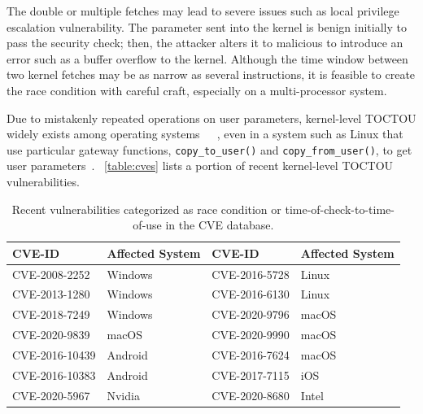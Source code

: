 The double or multiple fetches may lead to severe issues such as local privilege escalation vulnerability. The parameter sent into the kernel is benign initially to pass the security check; then, the attacker alters it to malicious to introduce an error such as a buffer overflow to the kernel. Although the time window between two kernel fetches may be as narrow as several instructions, it is feasible to create the race condition with careful craft, especially on a multi-processor system.


Due to mistakenly repeated operations on user parameters, kernel-level TOCTOU widely exists among operating systems~\cite{watson2007exploiting}~\cite{yang2012concurrency}~\cite{lu2008learning}, even in a system such as Linux that use particular gateway functions, \texttt{copy\_to\_user()} and \texttt{copy\_from\_user()}, to get user parameters~\cite{double-fetch-linux}. ~\autoref{table:cves} lists a portion of recent kernel-level TOCTOU vulnerabilities.


\begin{center}
\begin{table}[ht]
\small
\caption{Recent vulnerabilities categorized as race condition or time-of-check-to-time-of-use in the CVE database.}
\label{table:cves}
\centering
	\begin{tabular}{@{}>{\raggedright\arraybackslash}m{2.35cm}@{}|
			@{}>{\centering\arraybackslash}m{1.35cm}@{}|
			@{}>{\centering\arraybackslash}m{2.35cm}@{}|
			@{}>{\centering\arraybackslash}m{1.25cm}@{} } 
\hline
CVE-ID & Affected System & CVE-ID & Affected System \\ %
\hline
CVE-2008-2252  & Windows & CVE-2016-5728 & Linux \\
CVE-2013-1280  & Windows & CVE-2016-6130 & Linux \\
CVE-2018-7249  & Windows & CVE-2020-9796 & macOS \\ 
CVE-2020-9839  & macOS   & CVE-2020-9990 & macOS \\
CVE-2016-10439 & Android & CVE-2016-7624 & macOS \\
CVE-2016-10383 & Android & CVE-2017-7115 & iOS \\

CVE-2020-5967  & Nvidia  & CVE-2020-8680 & Intel \\
\hline

\end{tabular}
\end{table}
\end{center}





